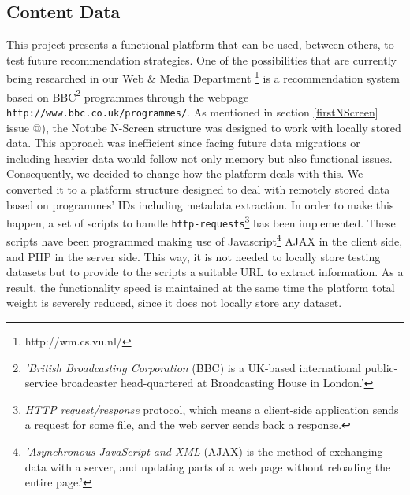 \documentclass{acm_proc_article-sp}
\makeatletter
\newcommand*{\rom}[1]{\expandafter\@slowromancap\romannumeral #1@}
\makeatother
\begin{document}
\subsection{Content Data} \label{data}
This project presents a functional platform that can be used, between others, to test future recommendation strategies. One of the possibilities that are currently being researched in our Web \& Media Department \footnote{http://wm.cs.vu.nl/} is a recommendation system based on BBC\cite{wiki:bbc}\footnote{\textit{'British Broadcasting Corporation} (BBC) is a UK-based international public-service broadcaster head-quartered at Broadcasting House in London.'} programmes through the webpage \texttt{http://www.bbc.co.uk/programmes/}. As mentioned in section \ref{firstNScreen} issue \rom{5}), the Notube N-Screen structure was designed to work with locally stored data. This approach was inefficient since facing future data migrations or including heavier data would follow not only memory but also functional issues. Consequently, we decided to change how the platform deals with this. We converted it to a platform structure designed to deal with remotely stored data based on programmes' IDs including metadata extraction. In order to make this happen, a set of scripts to handle \texttt{http-requests}\footnote{ \textit{HTTP request/response} protocol, which means a client-side application sends a request for some file, and the web server sends back a response.} has been implemented. These scripts have been programmed making use of Javascript\cite{w3c:ajax}\footnote{\textit{'Asynchronous JavaScript and XML} (AJAX) is the method of exchanging data with a server, and updating parts of a web page without reloading the entire page.'} AJAX in the client side, and PHP in the server side. This way, it is not needed to locally store testing datasets but to provide to the scripts a suitable URL to extract information. As a result, the functionality speed is maintained at the same time the platform total weight is severely reduced, since it does not locally store any dataset. 
\end{document}
